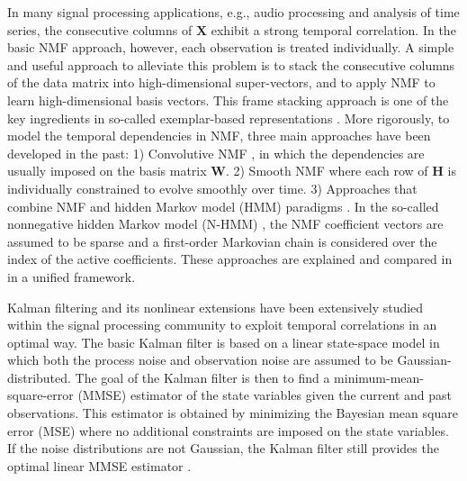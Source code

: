 \documentclass[10pt,twocolumn,twoside] {IEEEtran}
\begin{document}
In many signal processing applications, e.g., audio processing and
analysis of time series, the consecutive columns of $\mathbf{X}$
exhibit a strong temporal correlation. In the basic NMF approach, however, each
observation is treated individually. A simple and useful approach to alleviate this problem is to stack the consecutive columns of the data matrix into high-dimensional super-vectors, and to apply NMF to learn high-dimensional basis vectors. This frame stacking approach is one of the key ingredients in so-called exemplar-based representations \cite{Gemmeke2011a}. More rigorously, to model the temporal dependencies
in NMF, three main approaches have been developed in the past: 1)
Convolutive NMF \cite{Smaragdis2007,Wang2009}, in which the dependencies
are usually imposed on the basis matrix $\mathbf{W}$. 2) Smooth NMF \cite[and references therein]{Fevotte2009,Mohammadiha2013d}
where each row of $\mathbf{H}$ is individually constrained to evolve smoothly over time. 3) Approaches that combine NMF and hidden Markov
model (HMM) paradigms \cite{Mysore2010,Nakano2010,Mohammadiha2013c,Mohammadiha2013}.
In the so-called nonnegative hidden Markov model (N-HMM) \cite{Mysore2010,Mohammadiha2013c},
the NMF coefficient vectors are assumed to be sparse
and a first-order Markovian chain is considered over the index of
the active coefficients. These approaches are explained and compared in \cite{Smaragdis2014} in a unified framework.

Kalman filtering and its nonlinear extensions \cite{Kailath2000,Simon2006}
have been extensively studied within the signal processing community
to exploit temporal correlations in an optimal way. The basic
Kalman filter is based on a linear state-space model in which both
the process noise and observation noise are assumed to be Gaussian-distributed.
The goal of the Kalman filter is then to find a minimum-mean-square-error (MMSE) estimator of the state variables given the current and
past observations. This estimator is obtained by minimizing the Bayesian
mean square error (MSE) where no additional constraints are imposed
on the state variables. If the noise distributions are not Gaussian,
the Kalman filter still provides the optimal linear MMSE estimator \cite{Kailath2000}.
\end{document}
